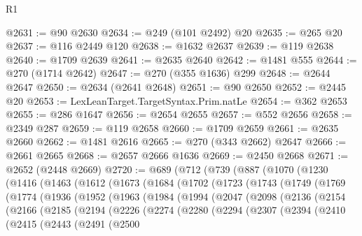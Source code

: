\begin{lexlean}{R1}
\begin{coremodule}
@2631 := @90 @2630
@2634 := @249 (@101 @2492) @20
@2635 := @265 @20
@2637 := @116 @2449 @120
@2638 := @1632 @2637
@2639 := @119 @2638
@2640 := @1709 @2639
@2641 := @2635 @2640
@2642 := @1481 @555
@2644 := @270 (@1714 @2642)
@2647 := @270 (@355 @1636) @299
@2648 := @2644 @2647
@2650 := @2634 (@2641 @2648)
@2651 := @90 @2650
@2652 := @2445 @20
@2653 := LexLeanTarget.TargetSyntax.Prim.natLe
@2654 := @362 @2653
@2655 := @286 @1647
@2656 := @2654 @2655
@2657 := @552 @2656
@2658 := @2349 @287
@2659 := @119 @2658
@2660 := @1709 @2659
@2661 := @2635 @2660
@2662 := @1481 @2616
@2665 := @270 (@343 @2662) @2647
@2666 := @2661 @2665
@2668 := @2657 @2666 @1636
@2669 := @2450 @2668
@2671 := @2652 (@2448 @2669)
@2720 := @689
    (@712
      (@739
        (@887
          (@1070
            (@1230
              (@1416
                (@1463
                  (@1612
                    (@1673
                      (@1684
                        (@1702
                          (@1723
                            (@1743
                              (@1749
                                (@1769
                                  (@1774
                                    (@1936
                                      (@1952
                                        (@1963
                                          (@1984
                                            (@1994
                                              (@2047
                                                (@2098
                                                  (@2136
                                                    (@2154
                                                      (@2166
                                                        (@2185
                                                          (@2194
                                                            (@2226
                                                              (@2274
                                                                (@2280
                                                                  (@2294
                                                                    (@2307
                                                                      (@2394
                                                                        (@2410
                                                                          (@2415
                                                                            (@2443
                                                                              (@2491
                                                                                (@2500

\end{coremodule}
\end{lexlean}
